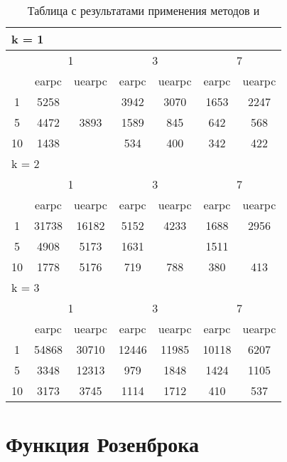 \begin{table}
  \centering
  \begin{tabular}{|*7{c|}}
    \hline
    \multicolumn{7}{|l|}{k = 1} \\
    \hline
    \multirow{2}{*}{\diagbox{$\mu$}{$\lambda$}} & \multicolumn{2}{c|}{1} & \multicolumn{2}{c|}{3} & \multicolumn{2}{c|}{7} \\
    \cline{2-7}
    & earpc & uearpc & earpc & uearpc & earpc & uearpc \\
    \hline
    1 & 5258 & \cellcolor{olive}{2434} & 3942 & 3070 & 1653 & 2247 \\
    \hline
    5 & 4472 & 3893 & 1589 & 845 & 642 & 568 \\
    \hline
    10 & 1438 & \cellcolor{olive}{728} & 534 & 400 & 342 & 422 \\
    \hline
    \multicolumn{7}{|l|}{k = 2} \\
    \hline
    \multirow{2}{*}{\diagbox{$\mu$}{$\lambda$}} & \multicolumn{2}{c|}{1} & \multicolumn{2}{c|}{3} & \multicolumn{2}{c|}{7} \\
    \cline{2-7}
    & earpc & uearpc & earpc & uearpc & earpc & uearpc \\
    \hline
    1 & 31738 & 16182 & 5152 & 4233 & 1688 & 2956 \\
    \hline
    5 & 4908 & 5173 & 1631 & \cellcolor{olive}{946} & 1511 & \cellcolor{olive}{626} \\
    \hline
    10 & 1778 & 5176 & 719 & 788 & 380 & 413 \\
    \hline
    \multicolumn{7}{|l|}{k = 3} \\
    \hline
    \multirow{2}{*}{\diagbox{$\mu$}{$\lambda$}} & \multicolumn{2}{c|}{1} & \multicolumn{2}{c|}{3} & \multicolumn{2}{c|}{7} \\
    \cline{2-7}
    & earpc & uearpc & earpc & uearpc & earpc & uearpc \\
    \hline
    1 & 54868 & 30710 & 12446 & 11985 & 10118 & 6207 \\
    \hline
    5 & 3348 & 12313 & 979 & 1848 & 1424 & 1105 \\
    \hline
    10 & 3173 & 3745 & 1114 & 1712 & 410 & 537 \\
    \hline
  \end{tabular}
  \captionsetup{justification=centering}
  \caption{Таблица с результатами применения методов  и }
\end{table}


\section{Функция Розенброка}


